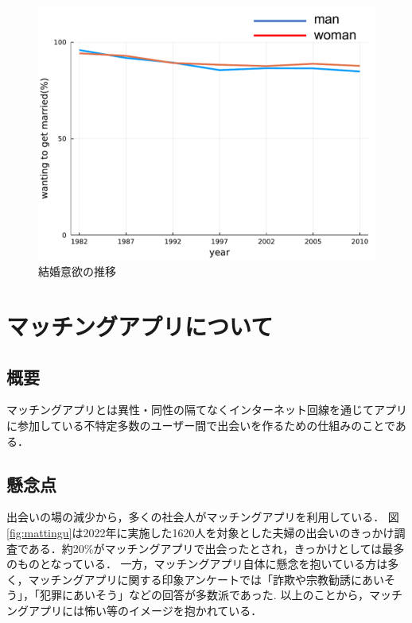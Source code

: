 \documentclass[12pt,a4j,titlepage]{ltjsarticle}
\begin{document}
\begin{figure}[h]
\begin{center}
\includegraphics[keepaspectratio, scale=0.7]{preview.pdf}
\end{center}
 \caption{結婚意欲の推移}
 \label{fig:iyoku}
\end{figure}

\clearpage

\section{マッチングアプリについて}
\subsection{概要}
マッチングアプリとは異性・同性の隔てなくインターネット回線を通じてアプリに参加している不特定多数のユーザー間で出会いを作るための仕組みのことである．
\subsection{懸念点}
出会いの場の減少から，多くの社会人がマッチングアプリを利用している．
図\ref{fig:mattingu}は2022年に実施した1620人を対象とした夫婦の出会いのきっかけ調査である．約20\%がマッチングアプリで出会ったとされ，きっかけとしては最多のものとなっている\cite{huuhuutyousa}．
一方，マッチングアプリ自体に懸念を抱いている方は多く，マッチングアプリに関する印象アンケートでは「詐欺や宗教勧誘にあいそう」，「犯罪にあいそう」などの回答が多数派であった\cite{prtimes}.
以上のことから，マッチングアプリには怖い等のイメージを抱かれている．
\end{document}
